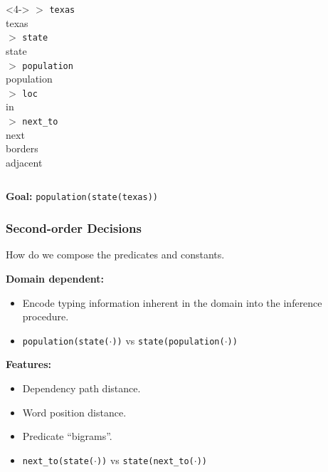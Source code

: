 \begin{frame}[plain]
\begin{center}
\begin{columns}
      \begin{column}{0.2\textwidth}
    \begin{footnotesize}
    \begin{block}{}<4->
      $>$ \texttt{texas} \\
      texas\\
      $>$ \texttt{state} \\
      state \\
      $>$ \texttt{population} \\
      population \\
      $>$ \texttt{loc} \\
      in \\
      $>$ \texttt{next\_to} \\
      next \\
      borders \\
      adjacent

    \end{block}

\end{footnotesize}
\end{column}
\end{columns}
\textbf{Goal:} \texttt{population(state(texas))}
\end{center}
  \end{frame}

\begin{frame}
  \frametitle{Second-order Decisions}

How do we compose the predicates and constants.

\textbf{Domain dependent:}
\begin{itemize}
\item Encode typing information inherent in the domain into the inference procedure.
\item \texttt{population(state($\cdot$))} vs \texttt{state(population($\cdot$))}
\end{itemize}

\textbf{Features:}
\begin{itemize}
\item Dependency path distance.
\item Word position distance.
\item Predicate ``bigrams''.
\item \texttt{next\_to(state($\cdot$))} vs \texttt{state(next\_to($\cdot$))}
\end{itemize}

\end{frame}

